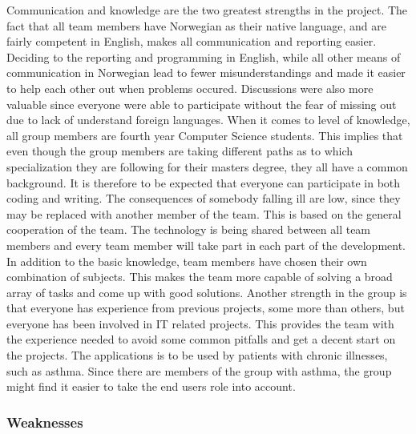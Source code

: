 Communication and knowledge are the two greatest strengths in the project. The fact that all 
team members have Norwegian as their native language, and are fairly competent in English, makes 
all communication and reporting easier. Deciding to the reporting and programming in English, 
while all other means of communication in Norwegian lead to fewer misunderstandings and made 
it easier to help each other out when problems occured. Discussions were also more valuable 
since everyone were able to participate without the fear of missing out due to lack of understand 
foreign languages. 
When it comes to level of knowledge, all group members are fourth year Computer Science students. 
This implies that even though the group members are taking different paths as to which 
specialization they are following for their masters degree, they all have a common background. 
It is therefore to be expected that everyone can participate in both coding and writing. The 
consequences of somebody falling ill are low, since they may be replaced with another member of 
the team. This is based on the general cooperation of the team.
The technology is being shared between all team members and every team member will take part in each part of the development. 
In addition to the basic knowledge, team members have chosen their own combination of subjects. 
This makes the team more capable of solving a broad array of tasks and come up with good solutions. 
Another strength in the group is that everyone has experience from previous projects, some more 
than others, but everyone has been involved in IT related projects. This provides the team with 
the experience needed to avoid some common pitfalls and get a decent start on the projects. 
The applications is to be used by patients with chronic illnesses, such as asthma. Since there are 
members of the group with asthma, the group might find it easier to take the end users role into account.


\subsubsection{Weaknesses}

